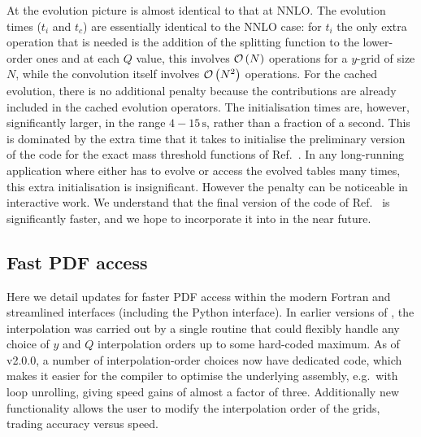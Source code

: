 At \ntlo the evolution picture is almost identical to that at NNLO.
%
The evolution times ($t_i$ and $t_c$) are essentially identical to the
NNLO case: for $t_i$ the only extra operation that is needed is the
addition of the \ntlo splitting function to the lower-order ones and
at each $Q$ value, this involves ${\cal O}\left(N\right)$ operations for a $y$-grid
of size $N$, while the convolution itself involves ${\cal O}\left(N^2\right)$
operations.
%
For the cached evolution, there is no additional penalty because the
\ntlo contributions are already included in the cached evolution
operators.
%
The initialisation times are, however, significantly larger, in the range
$4-15\, \mathrm{s}$, rather than a fraction of a second.
%
This is dominated by the extra time that it takes to initialise the
preliminary version of the code for the exact mass threshold functions
of Ref.~\cite{BlumleinCode}.
%
In any long-running application where \hoppet either
has to evolve or access the evolved tables many times, this extra
initialisation is insignificant.
%
However the penalty can be noticeable in interactive work.
%
We understand that the final version of the code of
Ref.~\cite{BlumleinCode} is significantly faster, and we hope to
incorporate it into \hoppet in the near future.



\subsection{Fast PDF access}
\label{sec:fastpdf}

Here we detail updates for faster PDF access within the
modern Fortran and streamlined interfaces (including the Python interface).
% 
%
In earlier versions of \hoppet, the interpolation was carried out by a
single routine that could flexibly handle any choice of $y$ and $Q$
interpolation orders up to some hard-coded maximum.
%
As of v2.0.0, a number of interpolation-order choices now have
dedicated code, which makes it easier for the compiler to optimise the
underlying assembly, e.g.\ with loop unrolling, giving speed gains of
almost a factor of three.
%
% 
Additionally new functionality allows the user to modify
the interpolation order of the \hoppet{} grids, trading accuracy
versus speed.

